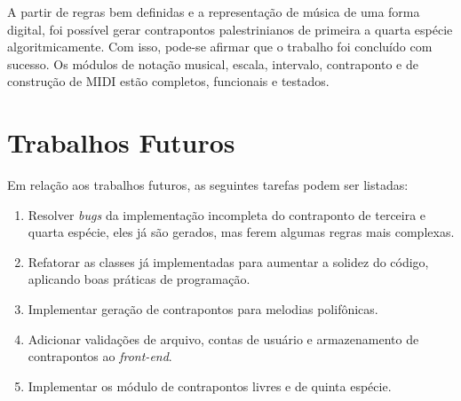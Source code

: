   A partir de regras bem definidas e a representação de música de uma forma digital, foi possível gerar contrapontos palestrinianos de primeira a quarta espécie algoritmicamente. Com isso, pode-se afirmar que o trabalho foi concluído com sucesso. Os módulos de notação musical, escala, intervalo, contraponto e de construção de MIDI estão completos, funcionais e testados.

  \section[Trabalhos Futuros]{Trabalhos Futuros}

    Em relação aos trabalhos futuros, as seguintes tarefas podem ser listadas:

    \begin{enumerate}
      \item Resolver \textit{bugs} da implementação incompleta do contraponto de terceira e quarta espécie, eles já são gerados, mas ferem algumas regras mais complexas.
      \item Refatorar as classes já implementadas para aumentar a solidez do código, aplicando boas práticas de programação.
      \item Implementar geração de contrapontos para melodias polifônicas.
      \item Adicionar validações de arquivo, contas de usuário e armazenamento de contrapontos ao \textit{front-end}.
      \item Implementar os módulo de contrapontos livres e de quinta espécie.
    \end{enumerate}
